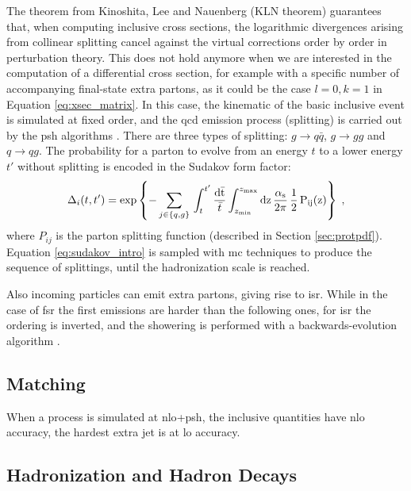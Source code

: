 The theorem from Kinoshita, Lee and Nauenberg (KLN theorem) \cite{Kinoshita:1962ur,Lee:1964is} guarantees that, 
when computing inclusive cross sections, the logarithmic divergences arising from collinear splitting cancel against the virtual corrections order by order in perturbation theory. 
This does not hold anymore when we are interested in the computation of a differential cross section, for example with a specific number of accompanying final-state extra partons, 
as it could be the case $l=0, k=1$ in Equation \ref{eq:xsec_matrix}. 
In this case, the kinematic of the basic inclusive event is simulated at fixed order, and the \gls{qcd} emission process (splitting) is carried out by the \gls{psh} algorithms \cite{Fox:1979ag}. There are three types of splitting: $g \rightarrow q\bar{q}$, $g \rightarrow gg$ and $q \rightarrow q g$.
The probability for a parton to evolve from an energy $t$ to a lower energy $t'$ without splitting is encoded in the Sudakov form factor:
\begin{equation}\label{eq:sudakov_intro}
  \Delta_i(t,t')=\exp\left\{-\sum_{j\in\{q,g\}}\,
  \int_t^{t'}\frac{\rm{d}\bar{t}}{\bar{t}}\int_{z_{\rm min}}^{z_{\rm max}}\rm{d} z\,
  \frac{\alpha_s}{2\pi}\,\frac{1}{2}\,P_{ij}(z)\right\}\;,
\end{equation}
\noindent where $P_{ij}$ is the parton splitting function (described in Section \ref{sec:protpdf}).
Equation \ref{eq:sudakov_intro} is sampled with \gls{mc} techniques to produce the sequence of splittings, until the hadronization scale is reached. 

Also incoming particles can emit extra partons, giving rise to \gls{isr}. While in the case of \gls{fsr} the first emissions are harder than the following ones, for \gls{isr} the ordering is inverted, and the showering is performed with a backwards-evolution algorithm \cite{Sjostrand:1985xi}.

\subsection{Matching}

When a process is simulated at \gls{nlo}+\gls{psh}, the inclusive quantities have \gls{nlo} accuracy, the hardest extra jet is at \gls{lo} accuracy.


\subsection{Hadronization and Hadron Decays}

